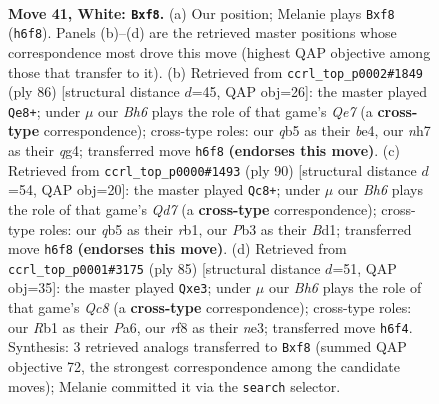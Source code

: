 \documentclass[11pt]{article}
\begin{document}
\clearpage

\begin{figure}[p]\centering
\begin{subfigure}{0.46\textwidth}\centering
\resizebox{\linewidth}{!}{%
\newchessgame
\chessboard[
  setfen={5r2/7n/5k1B/pqp4Q/8/1P6/P7/1R4K1 w - - 2 41},
  showmover=false,
  pgfstyle=straightmove, color=movearrow, markmove={h6-f8}
]}
\caption{}
\end{subfigure}\hfill
\begin{subfigure}{0.46\textwidth}\centering
\resizebox{\linewidth}{!}{%
\newchessgame
\chessboard[
  setfen={8/4Q3/6kp/Pn6/3pb1q1/8/6PP/R6K w - - 3 44},
  showmover=false,
  pgfstyle=straightmove, color=movearrow, markmove={e7-e8}
]}
\caption{}
\end{subfigure}
\\[4pt]
\begin{subfigure}{0.46\textwidth}\centering
\resizebox{\linewidth}{!}{%
\newchessgame
\chessboard[
  setfen={7k/3Q4/2p4q/4p3/1B2P1P1/1p6/8/1r1B1K2 w - - 13 46},
  showmover=false,
  pgfstyle=straightmove, color=movearrow, markmove={d7-c8}
]}
\caption{}
\end{subfigure}\hfill
\begin{subfigure}{0.46\textwidth}\centering
\resizebox{\linewidth}{!}{%
\newchessgame
\chessboard[
  setfen={6k1/5p2/p5p1/P2Q4/8/4N1PP/6K1/2q5 b - - 0 43},
  showmover=false,
  pgfstyle=straightmove, color=movearrow, markmove={c1-e3}
]}
\caption{}
\end{subfigure}
\caption{\textbf{Move 41, White: \texttt{Bxf8}.} (a) Our position; Melanie plays \texttt{Bxf8} (\texttt{h6f8}). Panels (b)--(d) are the retrieved master positions whose correspondence most drove this move (highest QAP objective among those that transfer to it). (b) Retrieved from \texttt{ccrl\_top\_p0002\#1849} (ply 86) [structural distance $d$=45, QAP obj=26]: the master played \texttt{Qe8+}; under $\mu$ our \emph{Bh6} plays the role of that game's \emph{Qe7} (a \textbf{cross-type} correspondence); cross-type roles: our \emph{q}b5 as their \emph{b}e4, our \emph{n}h7 as their \emph{q}g4; transferred move \texttt{h6f8} \textbf{(endorses this move)}. (c) Retrieved from \texttt{ccrl\_top\_p0000\#1493} (ply 90) [structural distance $d$=54, QAP obj=20]: the master played \texttt{Qc8+}; under $\mu$ our \emph{Bh6} plays the role of that game's \emph{Qd7} (a \textbf{cross-type} correspondence); cross-type roles: our \emph{q}b5 as their \emph{r}b1, our \emph{P}b3 as their \emph{B}d1; transferred move \texttt{h6f8} \textbf{(endorses this move)}. (d) Retrieved from \texttt{ccrl\_top\_p0001\#3175} (ply 85) [structural distance $d$=51, QAP obj=35]: the master played \texttt{Qxe3}; under $\mu$ our \emph{Bh6} plays the role of that game's \emph{Qc8} (a \textbf{cross-type} correspondence); cross-type roles: our \emph{R}b1 as their \emph{P}a6, our \emph{r}f8 as their \emph{n}e3; transferred move \texttt{h6f4}. Synthesis: 3 retrieved analogs transferred to \texttt{Bxf8} (summed QAP objective 72, the strongest correspondence among the candidate moves); Melanie committed it via the \texttt{search} selector.}
\label{fig:thought-m80}
\end{figure}
\end{document}
